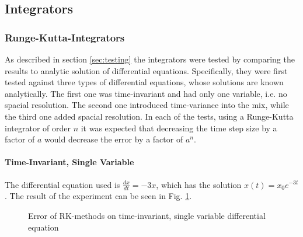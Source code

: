 \subsection{Integrators}
\subsubsection{Runge-Kutta-Integrators}
As described in section \ref{sec:testing} the integrators were tested by comparing the results to analytic solution of differential equations.
Specifically, they were first tested against three types of differential equations, whose solutions are known analytically.
The first one was time-invariant and had only one variable, i.e. no spacial resolution.
The second one introduced time-variance into the mix, while the third one added spacial resolution.
In each of the tests, using a Runge-Kutta integrator of order $n$ it was expected that decreasing the time step size by a factor of $a$ would decrease the error by a factor of $a^n$.\\
\paragraph*{Time-Invariant, Single Variable}
The differential equation used is $\frac{dx}{dt}=-3x$, which has the solution $x(t)=x_0e^{-3t}$.
The result of the experiment can be seen in Fig. \ref{fig:RK_error_y'=-3y}.
\begin{figure}[!h]
    \caption{Error of RK-methods on time-invariant, single variable differential equation}
    \label{fig:RK_error_y'=-3y}
\end{figure}

